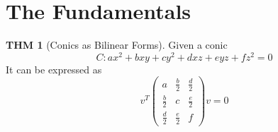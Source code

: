 \documentclass[twocolumn]{article}
\theoremstyle{definition}
\newtheorem{thm}{THM}
\theoremstyle{remark}
\begin{document}

\section{The Fundamentals}

\begin{thm}[Conics as Bilinear Forms]
	Given a conic
	$$
	C : ax^2 + bxy + cy^2 + dxz + e yz + fz^2 = 0
	$$
	It can be expressed as 
	\begin{dmath*}
	v^T 
	\begin{pmatrix}
		a & \frac{b}{2} & \frac{d}{2} \\
		\frac{b}{2} & c & \frac{e}{2} \\
		\frac{d}{2} & \frac{e}{2} & f
	\end{pmatrix}
	v = 0
	\end{dmath*}
\end{thm}
\end{document}
